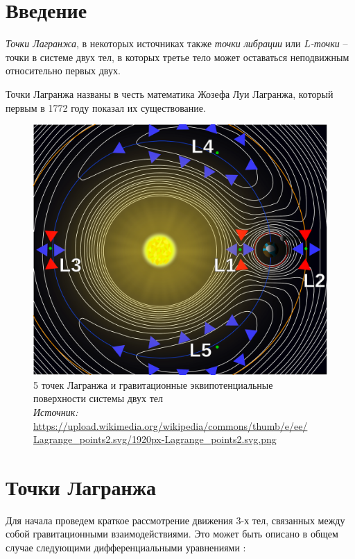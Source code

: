 \documentclass[12pt]{article}
\begin{document}
    \newpage

    \section{Введение}
    \par \textit{Точки Лагранжа}, в некоторых источниках также \textit{точки
    либрации} или \textit{$L$-точки} -- точки в системе двух тел, в которых
    третье тело может оставаться неподвижным относительно первых двух.
    \par Точки Лагранжа названы в честь математика Жозефа Луи Лагранжа,
    который первым в 1772 году показал их существование.

    \begin{figure}[H]
        \centering
        \includegraphics[scale=0.35]{Lagrange_points.pdf}
        \caption{5 точек Лагранжа и гравитационные эквипотенциальные
        поверхности системы двух тел\\
        \textit{Источник:}
        \url{https://upload.wikimedia.org/wikipedia/commons/thumb/e/ee/
        Lagrange_points2.svg/1920px-Lagrange_points2.svg.png}}
    \end{figure}

    \section{Точки Лагранжа}
    \par Для начала проведем краткое рассмотрение движения 3-х тел, связанных между
    собой гравитационными взаимодействиями. Это может быть описано в общем
    случае следующими дифференциальными уравнениями \cite{mit2008}:
\end{document}
